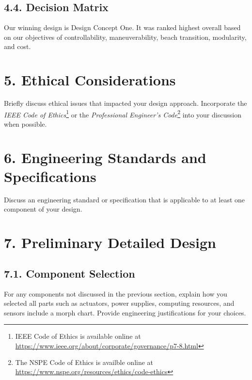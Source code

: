 \documentclass[10pt]{article}
\begin{document}
\subsection{4.4. Decision Matrix}
%
Our winning design is Design Concept One. It was ranked highest overall based on our objectives of controllability, maneuverability, beach transition, modularity, and cost. 

\section{5. Ethical Considerations}
Briefly discuss ethical issues that impacted your design approach.  Incorporate the \emph{IEEE Code of Ethics}\footnote{IEEE Code of Ethics is available online at \url{https://www.ieee.org/about/corporate/governance/p7-8.html}} or the \emph{Professional Engineer’s Code}\footnote{The NSPE Code of Ethics is availble online at \url{https://www.nspe.org/resources/ethics/code-ethics}} into your discussion when possible.

\section{6. Engineering Standards and Specifications}
Discuss an engineering standard or specification that is applicable to at least one component of your design.

\section{7. Preliminary Detailed Design}
\subsection{7.1. Component Selection}
For any components not discussed in the previous section, explain how you selected all parts such as actuators, power supplies, computing resources, and sensors include a morph chart.  Provide engineering justifications for your choices.
 
\end{document}
